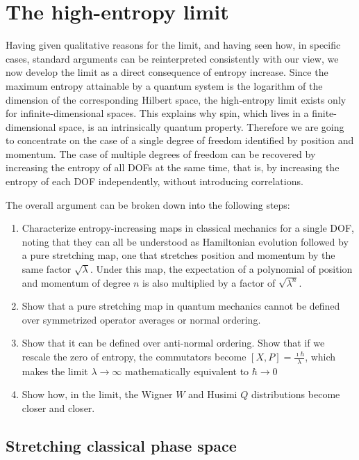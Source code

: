 \documentclass{article}
\begin{document}
\section{The high-entropy limit}

Having given qualitative reasons for the limit, and having seen how, in specific cases, standard arguments can be reinterpreted consistently with our view, we now develop the limit as a direct consequence of entropy increase. Since the maximum entropy attainable by a quantum system is the logarithm of the dimension of the corresponding Hilbert space,\cite{nielsen2010quantum} the high-entropy limit exists only for infinite-dimensional spaces. This explains why spin, which lives in a finite-dimensional space, is an intrinsically quantum property. Therefore we are going to concentrate on the case of a single degree of freedom identified by position and momentum. The case of multiple degrees of freedom can be recovered by increasing the entropy of all DOFs at the same time, that is, by increasing the entropy of each DOF independently, without introducing correlations.

The overall argument can be broken down into the following steps:
\begin{enumerate}
    \item Characterize entropy-increasing maps in classical mechanics for a single DOF, noting that they can all be understood as Hamiltonian evolution followed by a pure stretching map, one that stretches position and momentum by the same factor $\sqrt{\lambda}$. Under this map, the expectation of a polynomial of position and momentum of degree $n$ is also multiplied by a factor of $\sqrt{\lambda^n}$.
    \item Show that a pure stretching map in quantum mechanics cannot be defined over symmetrized operator averages or normal ordering.
    \item Show that it can be defined over anti-normal ordering. Show that if we rescale the zero of entropy, the commutators become $[X, P]= \frac{\imath \hbar}{\lambda}$, which makes the limit $\lambda \to \infty$ mathematically equivalent to $\hbar \to 0$
    \item Show how, in the limit, the Wigner $W$ and Husimi $Q$ distributions become closer and closer.
\end{enumerate}

\subsection{Stretching classical phase space}
\end{document}
